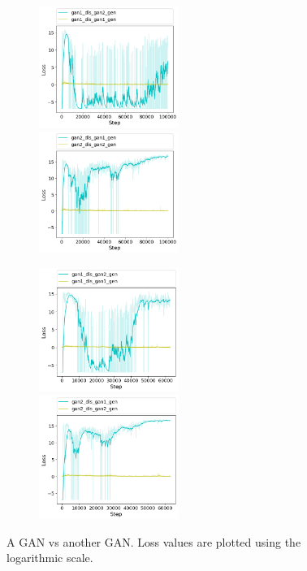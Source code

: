 \begin{figure}[h!] 
	\begin{subfigure}[b]{\textwidth}		
		\includegraphics[width=0.5\textwidth]{figures/cross_dis/trial15_gan1_dis_gan2_gen}
		\includegraphics[width=0.5\textwidth]{figures/cross_dis/trial15_gan2_dis_gan1_gen}
	\end{subfigure}
	\begin{subfigure}[b]{\textwidth}		
		\includegraphics[width=0.5\textwidth]{figures/cross_dis/trial14_gan1_dis_gan2_gen}
		\includegraphics[width=0.5\textwidth]{figures/cross_dis/trial14_gan2_dis_gan1_gen}
	\end{subfigure}
	\caption{A GAN vs another GAN. Loss values are plotted using the logarithmic scale.}
\end{figure}

